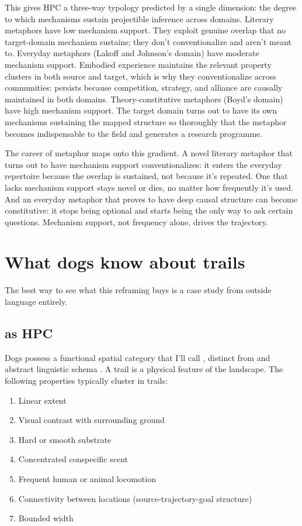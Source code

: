 \documentclass[12pt]{article}
\begin{document}
This gives HPC a three-way typology predicted by a single dimension: the degree to which mechanisms sustain projectible inference across domains. Literary metaphors have low mechanism support. They exploit genuine overlap that no target-domain mechanism sustains; they don't conventionalize and aren't meant to. Everyday metaphors (Lakoff and Johnson's domain) have moderate mechanism support. Embodied experience maintains the relevant property clusters in both source and target, which is why they conventionalize across communities:  persists because competition, strategy, and alliance are causally maintained in both domains. Theory-constitutive metaphors (Boyd's domain) have high mechanism support. The target domain turns out to have its own mechanisms sustaining the mapped structure so thoroughly that the metaphor becomes indispensable to the field and generates a research programme.

The career of metaphor \citep{bowdle2005} maps onto this gradient. A novel literary metaphor that turns out to have mechanism support conventionalizes: it enters the everyday repertoire because the overlap is sustained, not because it's repeated. One that lacks mechanism support stays novel or dies, no matter how frequently it's used. And an everyday metaphor that proves to have deep causal structure can become constitutive: it stops being optional and starts being the only way to ask certain questions. Mechanism support, not frequency alone, drives the trajectory.

\section{What dogs know about trails}
\label{sec:dogs}

The best way to see what this reframing buys is a case study from outside language entirely.

\subsection{ as HPC}

Dogs possess a functional spatial category that I'll call , distinct from  and  abstract linguistic schema . A trail is a physical feature of the landscape. The following properties typically cluster in trails:

\begin{enumerate}
\item Linear extent
\item Visual contrast with surrounding ground
\item Hard or smooth substrate
\item Concentrated conspecific scent
\item Frequent human or animal locomotion
\item Connectivity between locations (source-trajectory-goal structure)
\item Bounded width
\end{enumerate}
\end{document}
